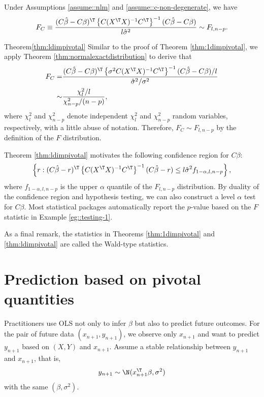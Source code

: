 \begin{theorem}
\label{thm:ldimpivotal}Under Assumptions \ref{assume::nlm} and \ref{assume::c-non-degenerate}, we have 
\[
F_C \equiv 
\frac{(C\hat{\beta}-C\beta)^{\T}\left\{ C(X^{\T}X)^{-1}C^{\T}\right\} ^{-1}(C\hat{\beta}-C\beta)}{l\hat{\sigma}^{2}}\sim F_{l,n-p}.
\]
\end{theorem}


\begin{myproof}{Theorem}{\ref{thm:ldimpivotal}}
Similar to the proof of Theorem \ref{thm:1dimpivotal}, we apply Theorem
\ref{thm:normalexactdistribution} to derive that
\[
\begin{aligned} 
F_C
= & \frac{(C\hat{\beta}-C\beta)^{\T}\left\{ \sigma^{2}C(X^{\T}X)^{-1}C^{\T}\right\} ^{-1}(C\hat{\beta}-C\beta)/l}{\hat{\sigma}^{2}/\sigma^{2}}\\
\sim & \frac{\chi_{l}^{2}/l}{\chi_{n-p}^{2}/(n-p)} ,
\end{aligned}
\]
where $\chi_{l}^{2} $ and $\chi_{n-p}^{2} $ denote independent $\chi_{l}^{2} $ and $\chi_{n-p}^{2} $ random variables, respectively, with a little abuse of notation. Therefore, $F_C  \sim  F_{l,n-p}$ by the definition of the $F$ distribution. 
\end{myproof}



Theorem \ref{thm:ldimpivotal} motivates the following confidence
region for $C\beta$:
\[
\left\{ r  :(C\hat{\beta}- r )^{\T}\left\{ C(X^{\T}X)^{-1}C^{\T}\right\} ^{-1}(C\hat{\beta}- r)\leq l\hat{\sigma}^{2}
f_{1-\alpha, l, n-p}
\right\} ,
\]
 where $f_{1-\alpha, l, n-p}$ is the upper $\alpha$ quantile of the
$F_{l,n-p}$ distribution. By duality of the confidence region and hypothesis
testing, we can also construct a level $\alpha$ test for $C\beta$. Most statistical packages automatically report the $p$-value based on the $F$ statistic in Example \ref{eg::testing-1}. 
 

As a final remark, the statistics in Theorems \ref{thm:1dimpivotal}
and \ref{thm:ldimpivotal} are called the Wald-type statistics. 

\section{Prediction based on pivotal quantities}\label{sec::prection-normallinear}

Practitioners use OLS not only to infer $\beta$ but also to predict
future outcomes. For the pair of future data $(x_{n+1},y_{n+1})$, we observe
only $x_{n+1}$ and want to predict $y_{n+1}$ based on $(X,Y)$ and $x_{n+1}$.
Assume a stable relationship between $y_{n+1}$ and $x_{n+1}$, that is,
\[
y_{n+1}\sim\N(x_{n+1}^{\T}\beta,\sigma^{2})
\]
with the same $(\beta,\sigma^{2}).$ 


